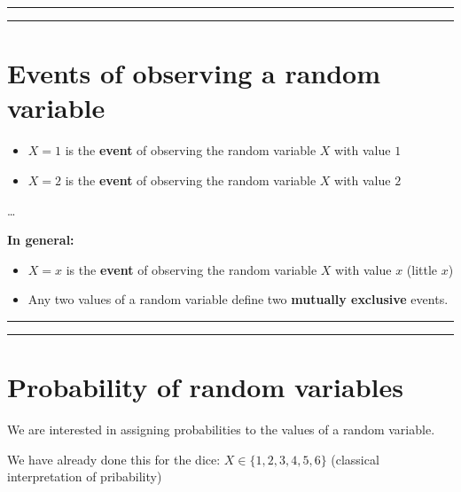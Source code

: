 \documentclass[
]{book}
\providecommand{\tightlist}{%
  \setlength{\itemsep}{0pt}\setlength{\parskip}{0pt}}
\begin{document}
\begin{center}\rule{0.5\linewidth}{0.5pt}\end{center}

\begin{center}\rule{0.5\linewidth}{0.5pt}\end{center}

\hypertarget{events-of-observing-a-random-variable}{%
\section{Events of observing a random variable}\label{events-of-observing-a-random-variable}}

\begin{itemize}
\tightlist
\item
  \(X=1\) is the \textbf{event} of observing the random variable \(X\) with value \(1\)
\item
  \(X=2\) is the \textbf{event} of observing the random variable \(X\) with value \(2\)
\end{itemize}

\ldots{}

\textbf{In general:}

\begin{itemize}
\item
  \(X=x\) is the \textbf{event} of observing the random variable \(X\) with value \(x\) (little \(x\))
\item
  Any two values of a random variable define two \textbf{mutually exclusive} events.
\end{itemize}

\begin{center}\rule{0.5\linewidth}{0.5pt}\end{center}

\begin{center}\rule{0.5\linewidth}{0.5pt}\end{center}

\hypertarget{probability-of-random-variables}{%
\section{Probability of random variables}\label{probability-of-random-variables}}

We are interested in assigning probabilities to the values of a random variable.

We have already done this for the dice: \(X \in \{1,2,3,4,5,6\}\) (classical interpretation of pribability)
\end{document}
